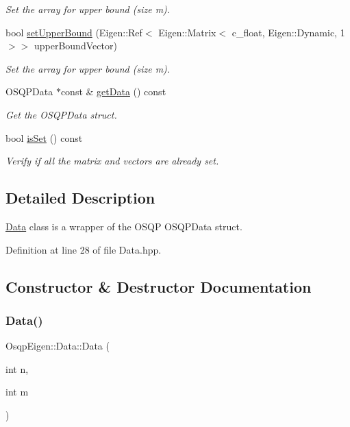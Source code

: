 \begin{DoxyCompactItemize}
\begin{DoxyCompactList}\small\item\em Set the array for upper bound (size m). \end{DoxyCompactList}\item 
bool \mbox{\hyperlink{classOsqpEigen_1_1Data_a192ea4157ba225bcf83dfce4231ca06f}{set\+Upper\+Bound}} (Eigen\+::\+Ref$<$ Eigen\+::\+Matrix$<$ c\+\_\+float, Eigen\+::\+Dynamic, 1 $>$$>$ upper\+Bound\+Vector)
\begin{DoxyCompactList}\small\item\em Set the array for upper bound (size m). \end{DoxyCompactList}\item 
O\+S\+Q\+P\+Data $\ast$const  \& \mbox{\hyperlink{classOsqpEigen_1_1Data_a4d9b55f6a91c0f83a178cc6927c2599b}{get\+Data}} () const
\begin{DoxyCompactList}\small\item\em Get the O\+S\+Q\+P\+Data struct. \end{DoxyCompactList}\item 
bool \mbox{\hyperlink{classOsqpEigen_1_1Data_aac543c780466b0db451ca60f0a5753eb}{is\+Set}} () const
\begin{DoxyCompactList}\small\item\em Verify if all the matrix and vectors are already set. \end{DoxyCompactList}\end{DoxyCompactItemize}


\subsection{Detailed Description}
\mbox{\hyperlink{classOsqpEigen_1_1Data}{Data}} class is a wrapper of the O\+S\+QP O\+S\+Q\+P\+Data struct. 

Definition at line 28 of file Data.\+hpp.



\subsection{Constructor \& Destructor Documentation}
\mbox{\label{classOsqpEigen_1_1Data_abc922eb476cd94d8cff33b41aa540132}} 
\subsubsection{\texorpdfstring{Data()}{Data()}}
{\footnotesize\ttfamily Osqp\+Eigen\+::\+Data\+::\+Data (\begin{DoxyParamCaption}\item[{int}]{n,  }\item[{int}]{m }\end{DoxyParamCaption})}



